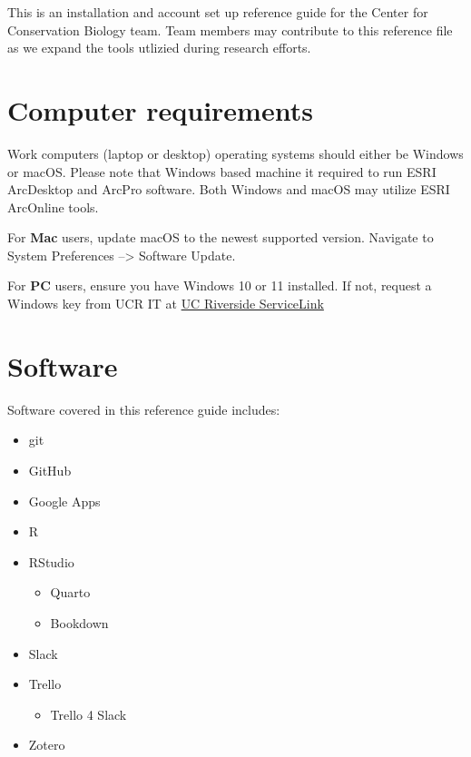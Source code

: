 \documentclass[
]{book}
\providecommand{\tightlist}{%
  \setlength{\itemsep}{0pt}\setlength{\parskip}{0pt}}
\begin{document}
This is an installation and account set up reference guide for the Center for Conservation Biology team. Team members may contribute to this reference file as we expand the tools utlizied during research efforts.

\hypertarget{computer-requirements}{%
\section{Computer requirements}\label{computer-requirements}}

Work computers (laptop or desktop) operating systems should either be Windows or macOS. Please note that Windows based machine it required to run ESRI ArcDesktop and ArcPro software. Both Windows and macOS may utilize ESRI ArcOnline tools.

For \textbf{Mac} users, update macOS to the newest supported version. Navigate to System Preferences --\textgreater{} Software Update.

For \textbf{PC} users, ensure you have Windows 10 or 11 installed. If not, request a Windows key from UCR IT at \href{https://ucrsupport.service-now.com/ucr_portal?id=ucr_home}{UC Riverside ServiceLink}

\hypertarget{software}{%
\section{Software}\label{software}}

Software covered in this reference guide includes:

\begin{itemize}
\tightlist
\item
  git
\item
  GitHub
\item
  Google Apps
\item
  R
\item
  RStudio

  \begin{itemize}
  \tightlist
  \item
    Quarto
  \item
    Bookdown
  \end{itemize}
\item
  Slack
\item
  Trello

  \begin{itemize}
  \tightlist
  \item
    Trello 4 Slack
  \end{itemize}
\item
  Zotero
\end{itemize}
\end{document}
